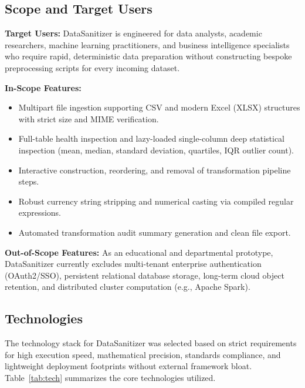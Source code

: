 \subsection{Scope and Target Users}
\textbf{Target Users:}
DataSanitizer is engineered for data analysts, academic researchers, machine learning practitioners, and business intelligence specialists who require rapid, deterministic data preparation without constructing bespoke preprocessing scripts for every incoming dataset.

\textbf{In-Scope Features:}
\begin{itemize}
  \item Multipart file ingestion supporting CSV and modern Excel (XLSX) structures with strict size and MIME verification.
  \item Full-table health inspection and lazy-loaded single-column deep statistical inspection (mean, median, standard deviation, quartiles, IQR outlier count).
  \item Interactive construction, reordering, and removal of transformation pipeline steps.
  \item Robust currency string stripping and numerical casting via compiled regular expressions.
  \item Automated transformation audit summary generation and clean file export.
\end{itemize}

\textbf{Out-of-Scope Features:}
As an educational and departmental prototype, DataSanitizer currently excludes multi-tenant enterprise authentication (OAuth2/SSO), persistent relational database storage, long-term cloud object retention, and distributed cluster computation (e.g., Apache Spark).

\subsection{Technologies}
The technology stack for DataSanitizer was selected based on strict requirements for high execution speed, mathematical precision, standards compliance, and lightweight deployment footprints without external framework bloat. Table~\ref{tab:tech} summarizes the core technologies utilized.


